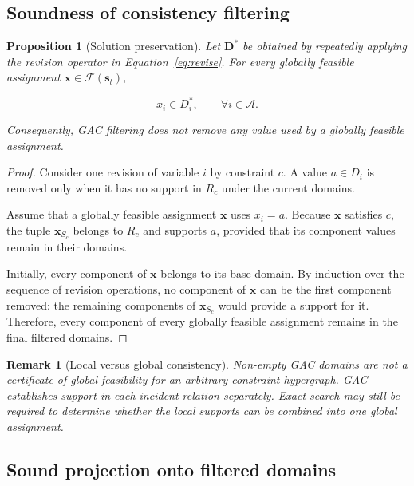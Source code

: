 \documentclass[pdflatex,sn-mathphys-num,iicol,oneside]{sn-jnl}
\newtheorem{proposition}{Proposition}
\newtheorem{remark}{Remark}
\begin{document}
\subsection{Soundness of consistency filtering}

\begin{proposition}[Solution preservation]
Let $\bm{D}^{*}$ be obtained by repeatedly applying the revision
operator in Equation~\eqref{eq:revise}. For every globally feasible
assignment $\bm{x}\in\mathcal{F}(\bm{s}_t)$,

\begin{equation}
x_i\in D_i^{*},
\qquad
\forall i\in\mathcal{A}.
\end{equation}

Consequently, GAC filtering does not remove any value used by a
globally feasible assignment.
\end{proposition}

\begin{proof}
Consider one revision of variable $i$ by constraint $c$. A value
$a\in D_i$ is removed only when it has no support in $R_c$ under the
current domains.

Assume that a globally feasible assignment $\bm{x}$ uses $x_i=a$.
Because $\bm{x}$ satisfies $c$, the tuple $\bm{x}_{S_c}$ belongs to
$R_c$ and supports $a$, provided that its component values remain in
their domains.

Initially, every component of $\bm{x}$ belongs to its base domain.
By induction over the sequence of revision operations, no component
of $\bm{x}$ can be the first component removed: the remaining
components of $\bm{x}_{S_c}$ would provide a support for it.
Therefore, every component of every globally feasible assignment
remains in the final filtered domains.
\end{proof}

\begin{remark}[Local versus global consistency]
Non-empty GAC domains are not a certificate of global feasibility for
an arbitrary constraint hypergraph. GAC establishes support in each
incident relation separately. Exact search may still be required to
determine whether the local supports can be combined into one global
assignment.
\end{remark}

\subsection{Sound projection onto filtered domains}
\end{document}
